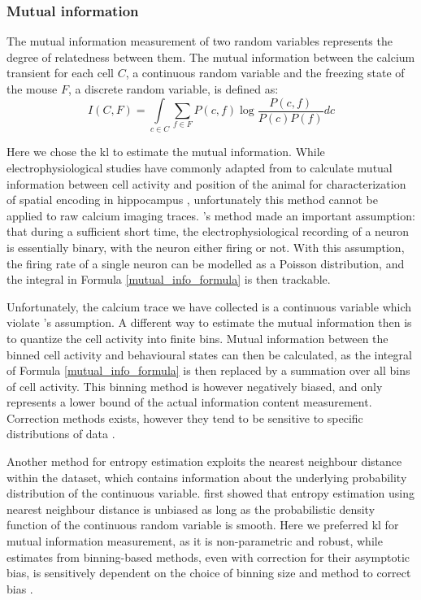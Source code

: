\subsubsection{Mutual information}

The mutual information measurement of two random variables represents the degree of relatedness between them. The mutual information between the calcium transient for each cell $C$, a continuous random variable and the freezing state of the mouse $F$, a discrete random variable, is defined as:
\begin{equation} \label{mutual_info_formula}
    I(C, F) = \int\limits_{c \in C} \sum_{f \in F} P(c,f)\log\frac{P(c,f)}{P(c)P(f)}dc
\end{equation}

Here we chose the \gls{kl} to estimate the mutual information. While electrophysiological studies have commonly adapted from \citet{skaggs93} to calculate mutual information between cell activity and position of the animal for characterization of spatial encoding in hippocampus \citet[e.g.]{knierim95, skaggs96, ji07, cheng13, roux17}, unfortunately this method cannot be applied to raw calcium imaging traces. \citet{skaggs93}'s method made an important assumption: that during a sufficient short time, the electrophysiological recording of a neuron is essentially binary, with the neuron either firing or not. With this assumption, the firing rate of a single neuron can be modelled as a Poisson distribution, and the integral in Formula \ref{mutual_info_formula} is then trackable.

Unfortunately, the calcium trace we have collected is a continuous variable which violate \citet{skaggs93}'s assumption. A different way to estimate the mutual information then is to quantize the cell activity into finite bins. Mutual information between the binned cell activity and behavioural states can then be calculated, as the integral of Formula \ref{mutual_info_formula} is then replaced by a summation over all bins of cell activity. This binning method is however negatively biased, and only represents a lower bound of the actual information content measurement. Correction methods exists, however they tend to be sensitive to specific distributions of data \citep{paninski03}.

Another method for entropy estimation exploits the nearest neighbour distance within the dataset, which contains information about the underlying probability distribution of the continuous variable. \citet{kozachenko87} first showed that entropy estimation using nearest neighbour distance is unbiased as long as the probabilistic density function of the continuous random variable is smooth. Here we preferred \gls{kl} for mutual information measurement, as it is non-parametric and robust, while estimates from binning-based methods, even with correction for their asymptotic bias, is sensitively dependent on the choice of binning size and method to correct bias \citep{victor02, ross14}. 

